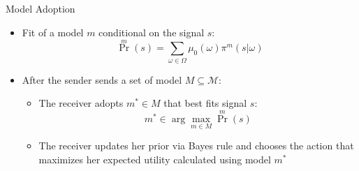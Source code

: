 \documentclass[aspectratio=169]{beamer}
\theoremstyle{definition}
\theoremstyle{plain}
\theoremstyle{plain}
\theoremstyle{definition}
\theoremstyle{plain}
\theoremstyle{plain}
\theoremstyle{plain}
\theoremstyle{plain}
\theoremstyle{remark}
\theoremstyle{definition}
\begin{document}
\begin{frame}[label=EN2]{Model Adoption}
    \begin{itemize}
        \item Fit of a model \( m \) conditional on the signal \( s \): \[ \textstyle{\Pr^m(s)} = \sum\limits_{\omega \in \Omega} \mu_0(\omega) \pi^m(s|\omega)\]
        \smallskip
        \item After the sender sends a set of model \( M \subseteq \mathcal{M} \):
        \smallskip
        \begin{itemize}
            \item The receiver adopts \(m^* \in M \) that best fits signal \( s \): \[ m^* \in \arg\max_{m \in M} \textstyle{\Pr^m(s)}\]
            \item The receiver updates her prior via Bayes rule and chooses the action that maximizes her expected utility calculated using model \( m^* \)
        \end{itemize}
    \end{itemize}
\end{frame}
\end{document}
